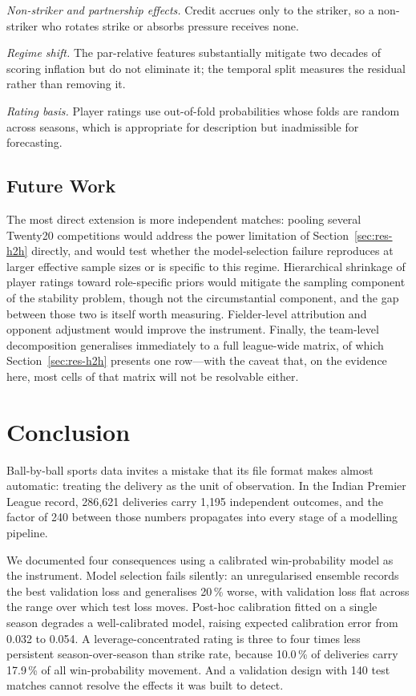 \documentclass[conference]{IEEEtran}
\begin{document}
\emph{Non-striker and partnership effects.} Credit accrues only to the
striker, so a non-striker who rotates strike or absorbs pressure
receives none.

\emph{Regime shift.} The par-relative features substantially mitigate
two decades of scoring inflation but do not eliminate it; the temporal
split measures the residual rather than removing it.

\emph{Rating basis.} Player ratings use out-of-fold probabilities whose
folds are random across seasons, which is appropriate for description
but inadmissible for forecasting.

\subsection{Future Work}

The most direct extension is more independent matches: pooling several
Twenty20 competitions would address the power limitation of
Section~\ref{sec:res-h2h} directly, and would test whether the
model-selection failure reproduces at larger effective sample sizes or
is specific to this regime. Hierarchical shrinkage of player ratings
toward role-specific priors would mitigate the sampling component of the
stability problem, though not the circumstantial component, and the gap
between those two is itself worth measuring. Fielder-level attribution
and opponent adjustment would improve the instrument. Finally, the
team-level decomposition generalises immediately to a full league-wide
matrix, of which Section~\ref{sec:res-h2h} presents one row---with the
caveat that, on the evidence here, most cells of that matrix will not be
resolvable either.

\section{Conclusion}

Ball-by-ball sports data invites a mistake that its file format makes
almost automatic: treating the delivery as the unit of observation. In
the Indian Premier League record, 286{,}621 deliveries carry 1{,}195
independent outcomes, and the factor of 240 between those numbers
propagates into every stage of a modelling pipeline.

We documented four consequences using a calibrated win-probability model
as the instrument. Model selection fails silently: an unregularised
ensemble records the best validation loss and generalises 20\,\% worse,
with validation loss flat across the range over which test loss moves.
Post-hoc calibration fitted on a single season degrades a
well-calibrated model, raising expected calibration error from 0.032 to
0.054. A leverage-concentrated rating is three to four times less
persistent season-over-season than strike rate, because 10.0\,\% of
deliveries carry 17.9\,\% of all win-probability movement. And a
validation design with 140 test matches cannot resolve the effects it
was built to detect.
\end{document}
